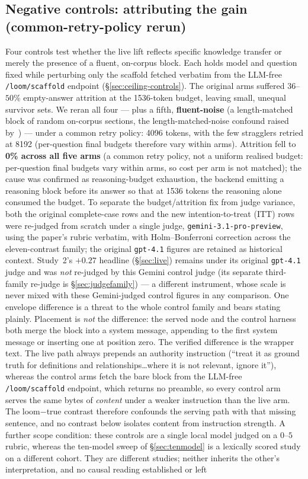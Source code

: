 \documentclass[10pt,twocolumn]{article}
\begin{document}
\subsection{Negative controls: attributing the gain (common-retry-policy rerun)}\label{sec:controls}
Four controls test whether the live lift reflects specific knowledge transfer or merely the presence of a fluent, on-corpus block. Each holds model and question fixed while perturbing only the scaffold fetched verbatim from the LLM-free \texttt{/loom/scaffold} endpoint (\S\ref{sec:ceiling-controls}). The original arms suffered $36$--$50\%$ empty-answer attrition at the 1536-token budget, leaving small, unequal survivor sets. We reran all four --- plus a fifth, \textbf{fluent-noise} (a length-matched block of random on-corpus sections, the length-matched-noise confound raised by~\textcite{cuconasu2024poweofnoise}) --- under a common retry policy: 4096 tokens, with the few stragglers retried at 8192 (per-question final budgets therefore vary within arms). Attrition fell to \textbf{0\% across all five arms} (a common retry policy, not a uniform realised budget: per-question final budgets vary within arms, so cost per arm is not matched); the cause was confirmed as reasoning-budget exhaustion, the backend emitting a reasoning block before its answer so that at 1536 tokens the reasoning alone consumed the budget. To separate the budget/attrition fix from judge variance, both the original complete-case rows and the new intention-to-treat (ITT) rows were re-judged from scratch under a single judge, \texttt{gemini-3.1-pro-preview}, using the paper's rubric verbatim, with Holm--Bonferroni correction across the eleven-contrast family; the original \texttt{gpt-4.1} figures are retained as historical context. Study~2's $+0.27$ headline (\S\ref{sec:live}) remains under its original \texttt{gpt-4.1} judge and was \emph{not} re-judged by this Gemini control judge (its separate third-family re-judge is \S\ref{sec:judgefamily}) --- a different instrument, whose scale is never mixed with these Gemini-judged control figures in any comparison. One envelope difference is a threat to the whole control family and bears stating plainly. Placement is \emph{not} the difference: the served node and the control harness both merge the block into a system message, appending to the first system message or inserting one at position zero. The verified difference is the wrapper text. The live path always prepends an authority instruction (``treat it as ground truth for definitions and relationships\ldots where it is not relevant, ignore it''), whereas the control arms fetch the bare block from the LLM-free \texttt{/loom/scaffold} endpoint, which returns no preamble, so every control arm serves the same bytes of \emph{content} under a weaker instruction than the live arm. The loom$-$true contrast therefore confounds the serving path with that missing sentence, and no contrast below isolates content from instruction strength. A further scope condition: these controls are a single local model judged on a $0$--$5$ rubric, whereas the ten-model sweep of \S\ref{sec:tenmodel} is a lexically scored study on a different cohort. They are different studies; neither inherits the other's interpretation, and no causal reading established or left 
\end{document}
